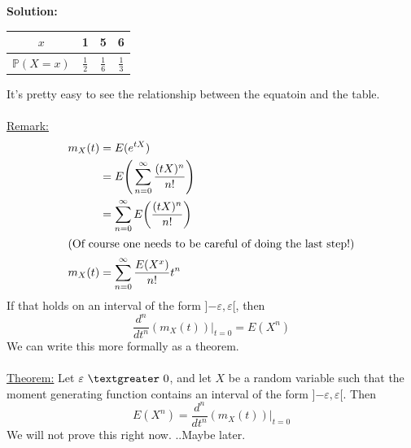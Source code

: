 \documentclass{article}
\newcommand{\bbP}{\mathbb{P}}
\newcommand{\ep}{\varepsilon}
\newcommand{\gt}{\textgreater}
\begin{document}
\textbf{Solution:}\\
\begin{center}
\begin{tabular}{| c || c | c | c |}
\hline
$x$ & 1 & 5 & 6\\
\hline
$\bbP(X=x)$ & $\frac{1}{2}$ & $\frac{1}{6}$ & $\frac{1}{3}$\\
\hline
\end{tabular}
\end{center}
It's pretty easy to see the relationship between the equatoin and the table.\\\\
\underline{Remark:}
\begin{align*}
	m_{X}(t) &= E(e^{tX})\\
			&= E\Bigg(\sum_{n=0}^{\infty} \frac{(tX)^{n}}{n!}\Bigg)\\
			&= \sum_{n=0}^{\infty} E\bigg(\frac{(tX)^{n}}{n!}\bigg)\\
			\intertext{(Of course one needs to be careful of doing the last step!)}
	m_{X}(t) &=  \sum_{n=0}^{\infty} \frac{E(X^{x})}{n!}t^{n}
\end{align*}
If that holds on an interval of the form ]$-\ep, \ep$[, then
\[\frac{d^{n}}{dt^{n}}(m_{X}(t)) \bigg\rvert_{t=0} = E(X^{n})\]
We can write this more formally as a theorem.\\\\
\underline{Theorem:} Let $\ep\ \gt\ 0$, and let $X$ be a random variable such that the moment generating function contains an interval of the form ]$-\ep, \ep$[. Then
\[E(X^{n}) = \frac{d^{n}}{dt^{n}}(m_{X}(t))\bigg\rvert_{t=0}\]
We will not prove this right now. ..Maybe later.\\\\\\\\\\
\end{document}
